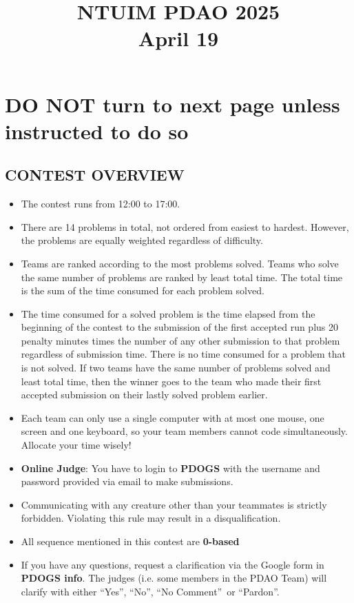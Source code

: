 \documentclass[12pt,a4paper]{article}
\begin{document}
\title{\textbf{NTUIM PDAO 2025}\\ April 19}
\date{}
\maketitle
\thispagestyle{fancy}
\section*{DO NOT turn to next page unless instructed to do so}
\subsection*{CONTEST OVERVIEW}
\begin{itemize} 
    \item The contest runs from 12:00 to 17:00.
    \item There are 14 problems in total, not ordered from easiest to hardest. However, the problems are equally weighted regardless of difficulty.
    \item Teams are ranked according to the most problems solved. Teams who solve the same number of problems are ranked by least total time. The total time is the sum of the time consumed for each problem solved. 
    \item The time consumed for a solved problem is the time elapsed from the beginning of the contest to the submission of the first accepted run plus 20 penalty minutes times the number of any other submission to that problem regardless of submission time. There is no time consumed for a problem that is not solved. If two teams have the same number of problems solved and least total time, then the winner goes to the team who made their first accepted submission on their lastly solved problem earlier.
    \item Each team can only use a single computer with at most one mouse, one screen and one keyboard, so your team members cannot code simultaneously. Allocate your time wisely! 
    \item \textbf{Online Judge}: You have to login to \textbf{PDOGS} with the username and password provided via email to make submissions.
    \item Communicating with any creature other than your teammates is strictly forbidden. Violating this rule may result in a disqualification.
    \item All sequence mentioned in this contest are \textbf{0-based}
    \item If you have any questions, request a clarification via the Google form in \textbf{PDOGS info}. The judges (i.e. some members in the PDAO Team) will clarify with either \textquotedblleft Yes\textquotedblright, \textquotedblleft No\textquotedblright, \textquotedblleft No Comment\textquotedblright\ or \textquotedblleft Pardon\textquotedblright.
\end{itemize}
\end{document}
